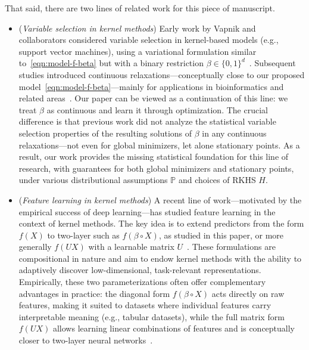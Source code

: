 \documentclass[sn-mathphys-num]{sn-jnl}%
\numberwithin{equation}{section}
\renewcommand{\P}{\mathbb{P}}
\theoremstyle{thmstyleone}%
\theoremstyle{thmstyletwo}%
\theoremstyle{thmstylethree}%
\begin{document}
That said, there are two lines of related work for this piece of manuscript. 
\vspace{.5em} 
\begin{itemize}
\item (\emph{Variable selection in kernel methods}) 
Early work by Vapnik and collaborators considered variable selection in kernel-based models (e.g., support vector machines), using a variational formulation similar to~\eqref{eqn:model-f-beta} but with a binary restriction $\beta \in \{0,1\}^d$~\cite{WestonMuChPoPoVa00, Guyonetal02}. Subsequent studies introduced continuous relaxations---conceptually close to our proposed model~\eqref{eqn:model-f-beta}---mainly for applications in bioinformatics and related areas~\cite{GrandvaletCa02, CaoShSuYaCh07, Allen13, ChenStWaJo17}. Our paper can be viewed as a continuation of this line: we treat $\beta$ as continuous and learn it through optimization. The crucial difference is that previous work did not analyze the statistical variable selection properties of the resulting solutions of $\beta$ in any continuous relaxations---not even for global minimizers, let alone stationary points. As a result, our work provides the missing statistical foundation for this line of research, with guarantees for both global minimizers and stationary points, under various distributional assumptions $\P$ and choices of RKHS $H$.

\vspace{.5em} 
\item (\emph{Feature learning in kernel methods})
A recent line of work---motivated by the empirical success of deep learning---has studied feature learning in the context of kernel methods. The key idea is to extend predictors from the form $f(X)$ to two-layer such as $f(\beta \circ X)$, as studied in this paper, or more generally $f(UX)$ with a learnable matrix $U$~\cite{FukumizuBaJo09, JordanLiRu21, ChenLiLiRu23, Adit24A, FollainBa24, LiRu25, LiRub25, ZhuDaDrFa25}. These formulations are compositional in nature and aim to endow kernel methods with the ability to adaptively discover low-dimensional, task-relevant representations. Empirically, these two parameterizations often offer complementary advantages in practice: the diagonal form $f(\beta \circ X)$ acts directly on raw features, making it suited to datasets where individual features carry interpretable meaning (e.g., tabular datasets), while the full matrix form $f(UX)$ allows learning linear combinations of features and is conceptually closer to two-layer neural networks~\cite{ChenLiLiRu23, Adit24A, Beagleholeetal25, ZhuDaDrFa25, DanhoferDaDuPo25}.


\end{itemize}
\end{document}
